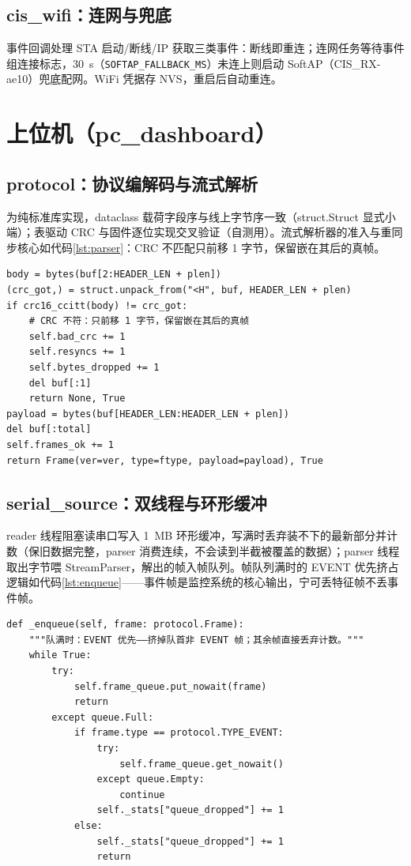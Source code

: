 \subsection{cis\_wifi：连网与兜底}

事件回调处理 STA 启动/断线/IP 获取三类事件：断线即重连；连网任务等待事件组连接标志，30~s（\texttt{SOFTAP\_FALLBACK\_MS}）未连上则启动 SoftAP（CIS\_RX-ae10）兜底配网。WiFi 凭据存 NVS，重启后自动重连。

\section{上位机（pc\_dashboard）}

\subsection{protocol：协议编解码与流式解析}

 为纯标准库实现，dataclass 载荷字段序与线上字节序一致（struct.Struct 显式小端）；表驱动 CRC 与固件逐位实现交叉验证（自测用）。流式解析器的准入与重同步核心如代码\ref{lst:parser}：CRC 不匹配只前移 1 字节，保留嵌在其后的真帧。

\begin{lstlisting}[style=pystyle, caption={流式解析：CRC 准入与失步重同步（protocol.py 节选）}, label={lst:parser}]
body = bytes(buf[2:HEADER_LEN + plen])
(crc_got,) = struct.unpack_from("<H", buf, HEADER_LEN + plen)
if crc16_ccitt(body) != crc_got:
    # CRC 不符：只前移 1 字节，保留嵌在其后的真帧
    self.bad_crc += 1
    self.resyncs += 1
    self.bytes_dropped += 1
    del buf[:1]
    return None, True
payload = bytes(buf[HEADER_LEN:HEADER_LEN + plen])
del buf[:total]
self.frames_ok += 1
return Frame(ver=ver, type=ftype, payload=payload), True
\end{lstlisting}

\subsection{serial\_source：双线程与环形缓冲}

reader 线程阻塞读串口写入 1~MB 环形缓冲，写满时丢弃装不下的最新部分并计数（保旧数据完整，parser 消费连续，不会读到半截被覆盖的数据）；parser 线程取出字节喂 StreamParser，解出的帧入帧队列。帧队列满时的 EVENT 优先挤占逻辑如代码\ref{lst:enqueue}——事件帧是监控系统的核心输出，宁可丢特征帧不丢事件帧。

\begin{lstlisting}[style=pystyle, caption={帧队列 EVENT 优先挤占（serial\_source.py 节选）}, label={lst:enqueue}]
def _enqueue(self, frame: protocol.Frame):
    """队满时：EVENT 优先——挤掉队首非 EVENT 帧；其余帧直接丢弃计数。"""
    while True:
        try:
            self.frame_queue.put_nowait(frame)
            return
        except queue.Full:
            if frame.type == protocol.TYPE_EVENT:
                try:
                    self.frame_queue.get_nowait()
                except queue.Empty:
                    continue
                self._stats["queue_dropped"] += 1
            else:
                self._stats["queue_dropped"] += 1
                return
\end{lstlisting}

